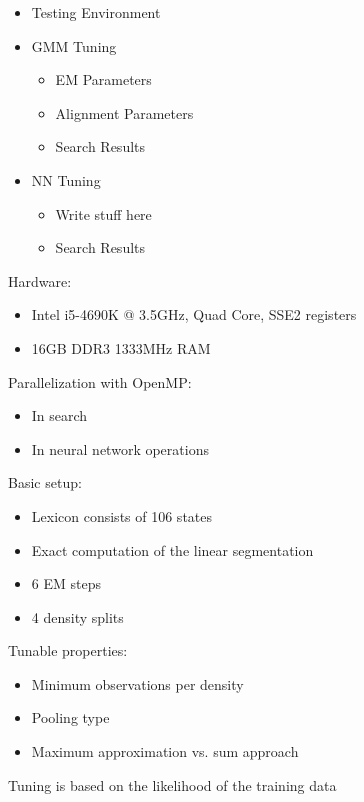 \documentclass[11pt, a4paper, landscape]{article}
\begin{document}
\TitlePage

\NewPage{}
\vfill
\begin{itemize}
  \item Testing Environment
  \item GMM Tuning
  \begin{itemize}
    \item EM Parameters
    \item Alignment Parameters
    \item Search Results
  \end{itemize}
  \item NN Tuning
  \begin{itemize}
    \item Write stuff here
    \item Search Results
  \end{itemize}
\end{itemize}
\vfill

\NewPage{}
\vfill
Hardware:
\begin{itemize}
  \item Intel i5-4690K @ 3.5GHz, Quad Core, SSE2 registers
  \item 16GB DDR3 1333MHz RAM
\end{itemize}
\vspace{20pt}
Parallelization with OpenMP:
\begin{itemize}
  \item In search
  \item In neural network operations
\end{itemize} 
\vfill

\NewPage{}
\vfill
Basic setup:
\begin{itemize}
  \item Lexicon consists of 106 states
  \item Exact computation of the linear segmentation
  \item 6 EM steps
  \item 4 density splits
\end{itemize} 
\vspace{20pt}
Tunable properties:
\begin{itemize}
  \item Minimum observations per density
  \item Pooling type
  \item Maximum approximation vs. sum approach
\end{itemize}
\vspace{20pt}
Tuning is based on the likelihood of the training data
\vfill
\end{document}
